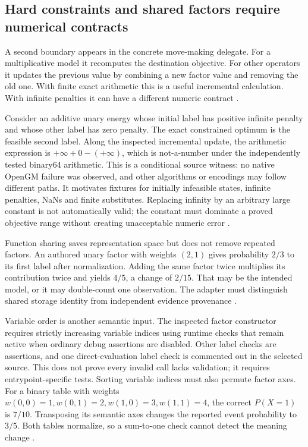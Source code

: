 \subsection{Hard constraints and shared factors require numerical contracts}
A second boundary appears in the concrete move-making delegate. For a
multiplicative model it recomputes the destination objective. For other
operators it updates the previous value by combining a new factor value
and removing the old one. With finite exact arithmetic this is a useful
incremental calculation. With infinite penalties it can have a different
numeric contract \citep{exec24_opengm_source}.

Consider an additive unary energy whose initial label has positive infinite
penalty and whose other label has zero penalty. The exact constrained
optimum is the feasible second label. Along the inspected incremental
update, the arithmetic expression is $+\infty+0-(+\infty)$, which is
not-a-number under the independently tested binary64 arithmetic. This is a
conditional source witness: no native OpenGM failure was observed, and
other algorithms or encodings may follow different paths. It motivates
fixtures for initially infeasible states, infinite penalties, NaNs and
finite substitutes. Replacing infinity by an arbitrary large constant is
not automatically valid; the constant must dominate a proved objective
range without creating unacceptable numeric error
\citep{exec24_opengm_source,exec24_opengm_choice}.

Function sharing saves representation space but does not remove repeated
factors. An authored unary factor with weights $(2,1)$ gives probability
$2/3$ to its first label after normalization. Adding the same factor twice
multiplies its contribution twice and yields $4/5$, a change of $2/15$.
That may be the intended model, or it may double-count one observation.
The adapter must distinguish shared storage identity from independent
evidence provenance \citep{exec24_opengm_paper,exec24_opengm_choice}.

Variable order is another semantic input. The inspected factor constructor
requires strictly increasing variable indices using runtime checks that
remain active when ordinary debug assertions are disabled. Other label
checks are assertions, and one direct-evaluation label check is commented
out in the selected source. This does not prove every invalid call lacks
validation; it requires entrypoint-specific tests. Sorting variable indices
must also permute factor axes. For a binary table with weights
$w(0,0)=1,w(0,1)=2,w(1,0)=3,w(1,1)=4$, the correct $P(X=1)$ is $7/10$.
Transposing its semantic axes changes the reported event probability to
$3/5$. Both tables normalize, so a sum-to-one check cannot detect the
meaning change \citep{exec24_opengm_source,exec24_opengm_choice}.

